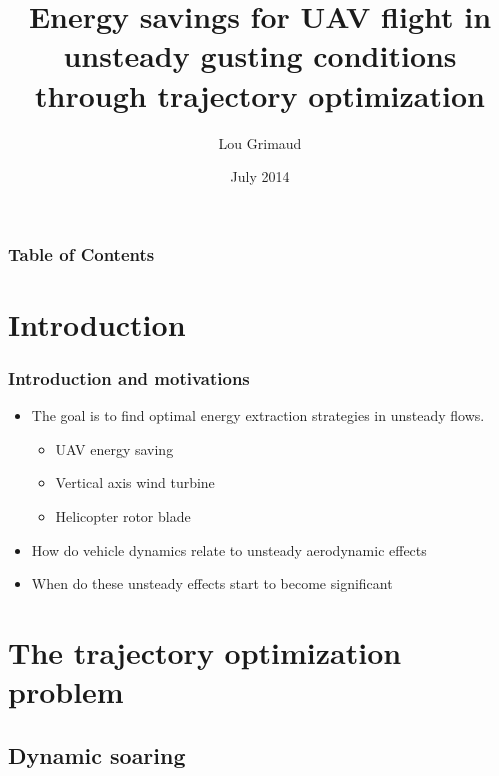 \documentclass[compress]{beamer}
\title[Trajectory optimization]{Energy savings for UAV flight in unsteady gusting conditions \\
through trajectory optimization }
\author{Lou Grimaud} %
\institute{Illinois Institute of Technology} %
\date{July 2014} %
\begin{document}


\frame{\titlepage}

\begin{frame}
  \frametitle{Table of Contents}
  \tableofcontents
\end{frame}

\section{Introduction}
\begin{frame}
  \frametitle{Introduction and motivations}
  \begin{itemize}
    \item The goal is to find optimal energy extraction strategies in unsteady flows.
  \begin{itemize}
  \item[\MVRightarrow] UAV energy saving
    \item[\MVRightarrow] Vertical axis wind turbine
    \item[\MVRightarrow] Helicopter rotor blade
  \end{itemize}

\item How do vehicle dynamics relate to unsteady aerodynamic effects 

\item When do these unsteady effects start to become significant
  \end{itemize}

\end{frame}

\section[Trajectory optimization]{The trajectory optimization problem}

\subsection{Dynamic soaring}
\end{document}
